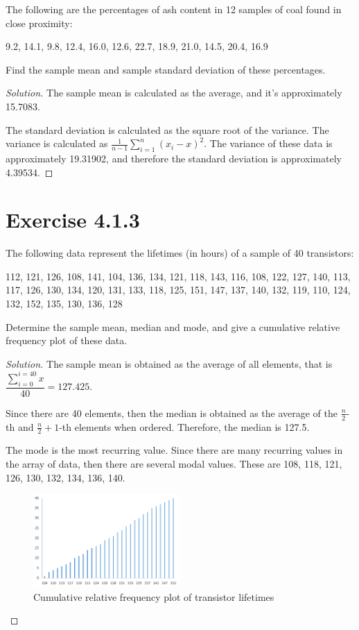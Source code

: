 \documentclass[titlepage, letterpaper, fleqn]{article}
\renewcommand\qedsymbol{\(\blacksquare\)}
\newenvironment{solution}
{\renewcommand\qedsymbol{$\square$}\begin{proof}[Solution]}
{\end{proof}}
\begin{document}
{\large The following are the percentages of ash content in 12 samples of coal found in close proximity:

9.2, 14.1, 9.8, 12.4, 16.0, 12.6, 22.7, 18.9, 21.0, 14.5, 20.4, 16.9

Find the sample mean and sample standard deviation of these percentages.}

\begin{solution}
The sample mean is calculated as the average, and it's approximately 15.7083.

The standard deviation is calculated as the square root of the variance.
The variance is calculated as $\frac{1}{n-1}\sum_{i=1}^{n} (x_i - x)^2$.
The variance of these data is approximately 19.31902,
and therefore the standard deviation is approximately 4.39534.
\end{solution}

\pagebreak

\section{Exercise 4.1.3}

{\large The following data represent the lifetimes (in hours) of a sample of 40 transistors:

112, 121, 126, 108, 141, 104, 136, 134,
121, 118, 143, 116, 108, 122, 127, 140,
113, 117, 126, 130, 134, 120, 131, 133,
118, 125, 151, 147, 137, 140, 132, 119,
110, 124, 132, 152, 135, 130, 136, 128

Determine the sample mean, median and mode, and give a cumulative relative frequency plot of these data.}

\begin{solution}
The sample mean is obtained as the average of all elements, that is $\dfrac{\sum_{i=0}^{i=40}x}{40} = 127.425$.

Since there are 40 elements, then the median is obtained as the average of the $\frac{n}{2}$-th and $\frac{n}{2} + 1$-th elements when ordered.
Therefore, the median is 127.5.

The mode is the most recurring value.
Since there are many recurring values in the array of data, then there are several modal values.
These are 108, 118, 121, 126, 130, 132, 134, 136, 140.

\begin{figure}[h!]
	\centering
	\includegraphics[width=0.5\textwidth]{img_4_1_3}
	\caption{Cumulative relative frequency plot of transistor lifetimes}
	\label{fig:4.1.3}
\end{figure}
\end{solution}
\end{document}
